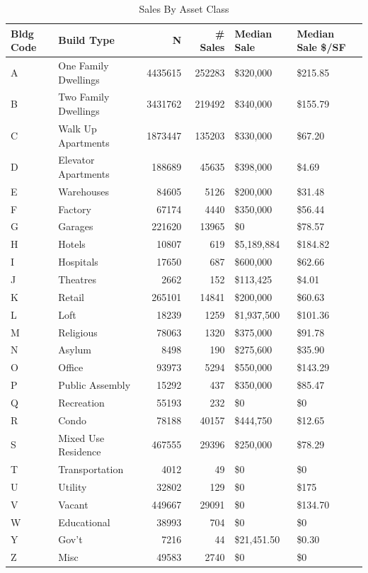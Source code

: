\documentclass[12pt,]{article}
\begin{document}
\begin{table}

\caption{\label{tab:by_class}\label{tab:by_class} Sales By Asset Class}
\centering
\begin{tabular}[t]{llrrll}
\toprule
Bldg Code & Build Type & N & \# Sales & Median Sale & Median Sale \$/SF\\
\midrule
A & One Family Dwellings & 4435615 & 252283 & \$320,000 & \$215.85\\
B & Two Family Dwellings & 3431762 & 219492 & \$340,000 & \$155.79\\
C & Walk Up Apartments & 1873447 & 135203 & \$330,000 & \$67.20\\
D & Elevator Apartments & 188689 & 45635 & \$398,000 & \$4.69\\
E & Warehouses & 84605 & 5126 & \$200,000 & \$31.48\\
\addlinespace
F & Factory & 67174 & 4440 & \$350,000 & \$56.44\\
G & Garages & 221620 & 13965 & \$0 & \$78.57\\
H & Hotels & 10807 & 619 & \$5,189,884 & \$184.82\\
I & Hospitals & 17650 & 687 & \$600,000 & \$62.66\\
J & Theatres & 2662 & 152 & \$113,425 & \$4.01\\
\addlinespace
K & Retail & 265101 & 14841 & \$200,000 & \$60.63\\
L & Loft & 18239 & 1259 & \$1,937,500 & \$101.36\\
M & Religious & 78063 & 1320 & \$375,000 & \$91.78\\
N & Asylum & 8498 & 190 & \$275,600 & \$35.90\\
O & Office & 93973 & 5294 & \$550,000 & \$143.29\\
\addlinespace
P & Public Assembly & 15292 & 437 & \$350,000 & \$85.47\\
Q & Recreation & 55193 & 232 & \$0 & \$0\\
R & Condo & 78188 & 40157 & \$444,750 & \$12.65\\
S & Mixed Use Residence & 467555 & 29396 & \$250,000 & \$78.29\\
T & Transportation & 4012 & 49 & \$0 & \$0\\
\addlinespace
U & Utility & 32802 & 129 & \$0 & \$175\\
V & Vacant & 449667 & 29091 & \$0 & \$134.70\\
W & Educational & 38993 & 704 & \$0 & \$0\\
Y & Gov't & 7216 & 44 & \$21,451.50 & \$0.30\\
Z & Misc & 49583 & 2740 & \$0 & \$0\\
\bottomrule
\end{tabular}
\end{table}
\end{document}

